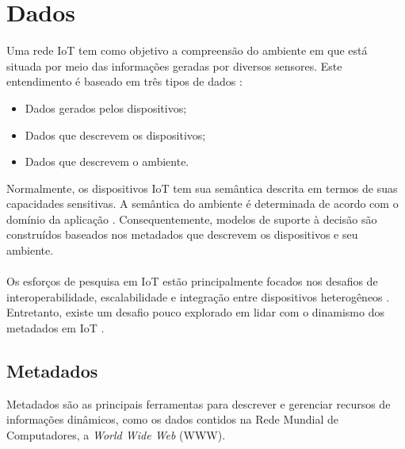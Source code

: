 \section{Dados}%
\label{sec:dados}
	\quad Uma rede \acrlong{IoT} tem como objetivo a compreensão do ambiente em que está situada por meio das informações geradas por diversos
  sensores. Este entendimento é baseado em três tipos de dados \cite{SemIOT}:
  \begin{itemize}
    \item Dados gerados pelos dispositivos;
    \item Dados que descrevem os dispositivos;
    \item Dados que descrevem o ambiente.
  \end{itemize}
  \quad Normalmente, os dispositivos \acrshort{IoT} tem sua semântica descrita em termos de suas capacidades sensitivas. A semântica do ambiente
  é determinada de acordo com o domínio da aplicação \cite{IOTdata}. Consequentemente, modelos de suporte à decisão são construídos
  baseados nos metadados que descrevem os dispositivos e seu ambiente.
  \\\\ \null
  \quad
  Os esforços de pesquisa em \acrlong{IoT} estão principalmente focados nos desafios de interoperabilidade, escalabilidade e integração entre dispositivos heterogêneos \cite{IOTdata}.
  Entretanto, existe um desafio pouco explorado em lidar com o dinamismo dos metadados em \acrshort{IoT} \cite{collaborative}.

	\subsection{Metadados}
  \quad Metadados são as principais ferramentas para descrever e gerenciar recursos de informações  dinâmicos, como os dados contidos na Rede Mundial de Computadores, a \textit{World Wide Web} (WWW).

